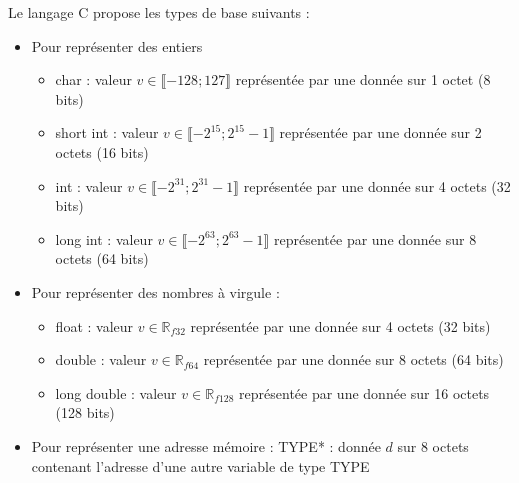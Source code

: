 \documentclass[../../../main.tex]{subfiles}
\begin{document}
Le langage C propose les types de base suivants :
\begin{itemize}
\item Pour représenter des entiers 
\begin{itemize}
	\item \textsf{char} : valeur $v\in{\llbracket-128; 127\rrbracket}$ représentée par une donnée sur 1 octet (8 bits) 
	\item \textsf{short int} : valeur $v\in{\llbracket-2^{15}; 2^{15}-1\rrbracket}$ représentée par une donnée sur 2 octets (16 bits) 
	\item \textsf{int} : valeur $v\in{\llbracket-2^{31}; 2^{31}-1\rrbracket}$ représentée par une donnée sur 4 octets (32 bits) 
	\item \textsf{long int} : valeur $v\in{\llbracket-2^{63}; 2^{63}-1\rrbracket}$ représentée par une donnée sur 8 octets (64 bits)
\end{itemize}
\item Pour représenter des nombres à virgule :
\begin{itemize}
	\item \textsf{float} : valeur $v\in{\mathbb{R}_{f32}}$ représentée par une donnée sur 4 octets (32 bits)
	\item \textsf{double} : valeur $v\in{\mathbb{R}_{f64}}$ représentée par une donnée sur 8 octets (64 bits)
	\item \textsf{long double} : valeur $v\in{\mathbb{R}_{f128}}$ représentée par une donnée sur 16 octets (128 bits)
\end{itemize}
\item Pour représenter une adresse mémoire : \textsf{TYPE*} : donnée $d$ sur 8 octets contenant l'adresse d'une autre variable de type \textsf{TYPE}
\end{itemize}
\end{document}
